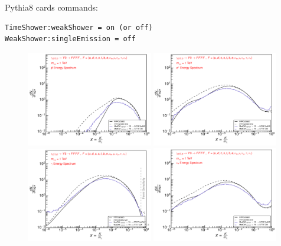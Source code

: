 \documentclass[epj,nopacs,fleqn]{svjour}
\begin{document}
Pythia8 cards commands:
\begin{verbatim}
TimeShower:weakShower = on (or off)
WeakShower:singleEmission = off
\end{verbatim}



\begin{figure}[!b]
\centering
\subfigure
{ \includegraphics[width=0.49\textwidth]{Fig/xdxd_Y0/1_antiprotons_FFFF_xdxd_1.pdf}}
\subfigure
{ \includegraphics[width=0.49\textwidth]{Fig/xdxd_Y0/1_positrons_FFFF_xdxd_1.pdf}}
\subfigure
{ \includegraphics[width=0.49\textwidth]{Fig/xdxd_Y0/1_gammas_FFFF_xdxd_1.pdf}}
\subfigure
{ \includegraphics[width=0.49\textwidth]{Fig/xdxd_Y0/1_neutrinos_e_FFFF_xdxd_1.pdf}}

\end{figure}
\end{document}
